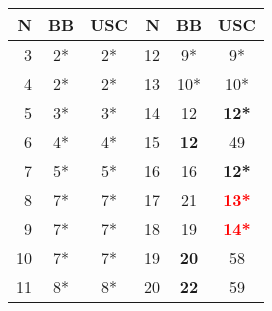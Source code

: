 \begin{table}[t]\scriptsize
\begin{tabular}{r|c|c||r|c|c}
 \hline
 N&BB &USC&N&BB&USC\\
 \hline
 3&2*&2*&12&9*&9*\\
 4&2*&2*&13&10*&10*\\
 5&3*&3*&14&12&\textbf{12*}\\
 6&4*&4*&15&\textbf{12}&49\\
 7&5*&5*&16&16&\textbf{12*}\\
 8&7*&7*&17&21&\textbf{\textcolor{red}{13*}}\\
 9&7*&7*&18&19&\textbf{\textcolor{red}{14*}}\\
 10&7*&7*&19&\textbf{20}&58\\
 11&8*&8*&20&\textbf{22}&59\\
\end{tabular}
\end{table} 